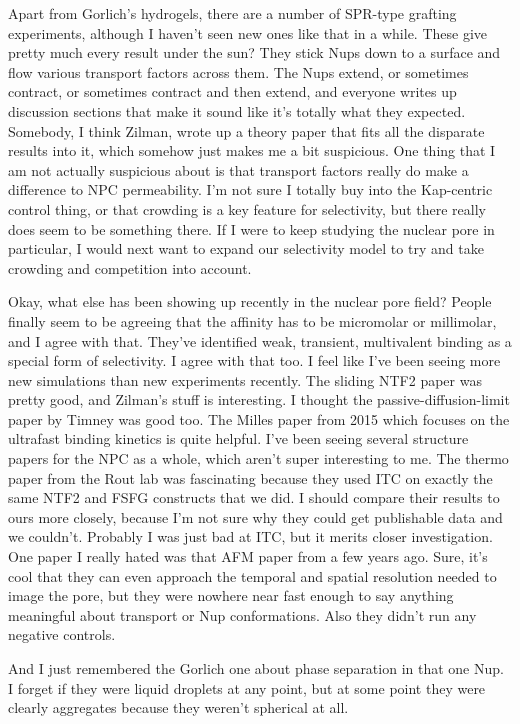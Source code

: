 {Apart from Gorlich's hydrogels, there are a number of SPR-type grafting experiments, although I haven't seen new ones like that in a while.  These give pretty much every result under the sun?  They stick Nups down to a surface and flow various transport factors across them.  The Nups extend, or sometimes contract, or sometimes contract and then extend, and everyone writes up discussion sections that make it sound like it's totally what they expected.  Somebody, I think Zilman, wrote up a theory paper that fits all the disparate results into it, which somehow just makes me a bit suspicious.  One thing that I am not actually suspicious about is that transport factors really do make a difference to NPC permeability.  I'm not sure I totally buy into the Kap-centric control thing, or that crowding is a key feature for selectivity, but there really does seem to be something there.  If I were to keep studying the nuclear pore in particular, I would next want to expand our selectivity model to try and take crowding and competition into account.

Okay, what else has been showing up recently in the nuclear pore field?  People finally seem to be agreeing that the affinity has to be micromolar or millimolar, and I agree with that.  They've identified weak, transient, multivalent binding as a special form of selectivity.  I agree with that too.  I feel like I've been seeing more new simulations than new experiments recently.  The sliding NTF2 paper was pretty good, and Zilman's stuff is interesting.  I thought the passive-diffusion-limit paper by Timney was good too.  The Milles paper from 2015 which focuses on the ultrafast binding kinetics is quite helpful.  I've been seeing several structure papers for the NPC as a whole, which aren't super interesting to me.  The thermo paper from the Rout lab was fascinating because they used ITC on exactly the same NTF2 and FSFG constructs that we did.  I should compare their results to ours more closely, because I'm not sure why they could get publishable data and we couldn't.  Probably I was just bad at ITC, but it merits closer investigation.  One paper I really hated was that AFM paper from a few years ago.  Sure, it's cool that they can even approach the temporal and spatial resolution needed to image the pore, but they were nowhere near fast enough to say anything meaningful about transport or Nup conformations.  Also they didn't run any negative controls.

And I just remembered the Gorlich one about phase separation in that one Nup.  I forget if they were liquid droplets at any point, but at some point they were clearly aggregates because they weren't spherical at all.

}
